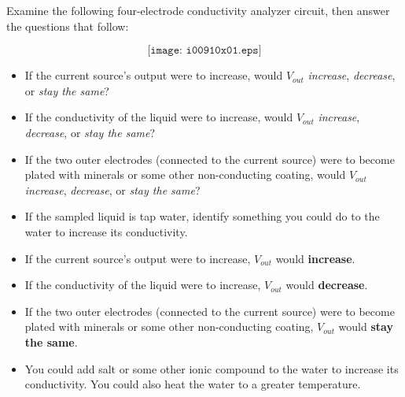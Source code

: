 

Examine the following four-electrode conductivity analyzer circuit, then answer the questions that follow:

$$\texttt{[image: i00910x01.eps]}$$

\begin{itemize}
\item{} If the current source's output were to increase, would $V_{out}$ {\it increase}, {\it decrease}, or {\it stay the same}?
\vskip 5pt
\item{} If the conductivity of the liquid were to increase, would $V_{out}$ {\it increase}, {\it decrease}, or {\it stay the same}?
\vskip 5pt
\item{} If the two outer electrodes (connected to the current source) were to become plated with minerals or some other non-conducting coating, would $V_{out}$ {\it increase}, {\it decrease}, or {\it stay the same}?
\vskip 5pt
\item{} If the sampled liquid is tap water, identify something you could do to the water to increase its conductivity.
\end{itemize}







\begin{itemize}
\item{} If the current source's output were to increase, $V_{out}$ would {\bf increase}.
\vskip 5pt
\item{} If the conductivity of the liquid were to increase, $V_{out}$ would {\bf decrease}.
\vskip 5pt
\item{} If the two outer electrodes (connected to the current source) were to become plated with minerals or some other non-conducting coating, $V_{out}$ would {\bf stay the same}.
\vskip 5pt
\item{} You could add salt or some other ionic compound to the water to increase its conductivity.  You could also heat the water to a greater temperature.
\end{itemize}






